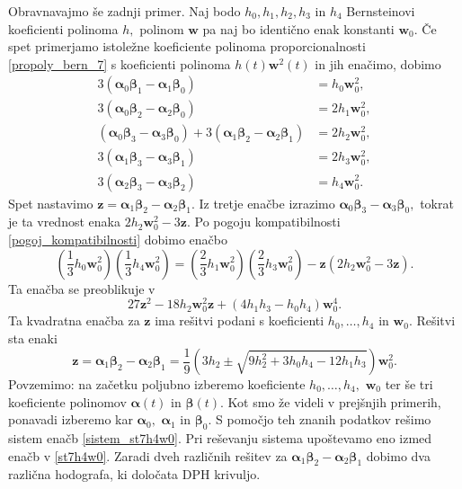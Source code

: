 \documentclass[12pt,a4paper,twoside]{article}
\theoremstyle{definition} %
\theoremstyle{plain} %
\theoremstyle{primerstyle}
\numberwithin{equation}{section}  %
\newcommand{\wV}{\mathbf{w}}
\newcommand{\zV}{\mathbf{z}}
\newcommand{\balpha}{\boldsymbol \alpha}
\newcommand{\bbeta}{\boldsymbol \beta}
\begin{document}
Obravnavajmo še zadnji primer. Naj bodo $h_0,h_1,h_2,h_3$ in $h_4$ Bernsteinovi koeficienti polinoma $h,$ polinom $\wV$ pa naj bo identično enak konstanti $\wV_0.$ Če spet primerjamo istoležne koeficiente polinoma proporcionalnosti \eqref{propoly_bern_7} s koeficienti polinoma $h(t)\wV^2(t)$ in jih enačimo, dobimo
\begin{align}
	3(\balpha_0\bbeta_1-\balpha_1\bbeta_0)&=h_0\wV_0^2,\nonumber\\
	3(\balpha_0\bbeta_2-\balpha_2\bbeta_0)&=2h_1\wV_0^2,\nonumber\\
	(\balpha_0\bbeta_3-\balpha_3\bbeta_0)+3(\balpha_1\bbeta_2-\balpha_2\bbeta_1)&=2h_2\wV_0^2,\label{sistem_st7h4w0}\\
	3(\balpha_1\bbeta_3-\balpha_3\bbeta_1)&=2h_3\wV_0^2,\nonumber\\
	3(\balpha_2\bbeta_3-\balpha_3\bbeta_2)&=h_4\wV_0^2.\nonumber
\end{align}
Spet nastavimo $\zV=\balpha_1\bbeta_2-\balpha_2\bbeta_1.$ Iz tretje enačbe izrazimo $\balpha_0\bbeta_3-\balpha_3\bbeta_0,$ tokrat je ta vrednost enaka $2h_2\wV_0^2-3\zV.$ Po pogoju kompatibilnosti \eqref{pogoj_kompatibilnosti} dobimo enačbo
\begin{equation*}
	\left(\frac{1}{3}h_0\wV_0^2\right)\left(\frac{1}{3}h_4\wV_0^2\right)=\left(\frac{2}{3}h_1\wV_0^2\right)\left(\frac{2}{3}h_3\wV_0^2\right)-\zV(2h_2\wV_0^2-3\zV).
\end{equation*}
Ta enačba se preoblikuje v
\begin{equation*}
	27\zV^2-18h_2\wV_0^2\zV+(4h_1h_3-h_0h_4)\wV_0^4.
\end{equation*}
Ta kvadratna enačba za $\zV$ ima rešitvi podani s koeficienti $h_0,\dots,h_4$ in $\wV_0.$ Rešitvi sta enaki
\begin{equation}
	\label{st7h4w0}
	\zV=\balpha_1\bbeta_2-\balpha_2\bbeta_1=\frac{1}{9}\left(3h_2\pm\sqrt{9h_2^2+3h_0h_4-12h_1h_3}\right)\wV_0^2.
\end{equation}
Povzemimo: na začetku poljubno izberemo koeficiente $h_0,\dots,h_4,$ $\wV_0$ ter še tri koeficiente polinomov $\balpha(t)$ in $\bbeta(t).$ Kot smo že videli v prejšnjih primerih, ponavadi izberemo kar $\balpha_0,$ $\balpha_1$ in $\bbeta_0.$ S pomočjo teh znanih podatkov rešimo sistem enačb \eqref{sistem_st7h4w0}. Pri reševanju sistema upoštevamo eno izmed enačb v \eqref{st7h4w0}. Zaradi dveh različnih rešitev za $\balpha_1\bbeta_2-\balpha_2\bbeta_1$ dobimo dva različna hodografa, ki določata DPH krivuljo.

\end{document}
